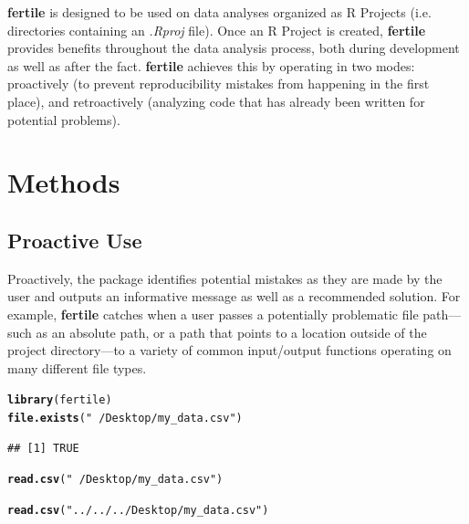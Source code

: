 \documentclass[APA,LATO1COL]{WileyNJD-v2}\usepackage[]{graphicx}\usepackage[]{color}
\makeatletter
\newcommand{\hlstr}[1]{\textcolor[rgb]{0.192,0.494,0.8}{#1}}%
\newcommand{\hlstd}[1]{\textcolor[rgb]{0.345,0.345,0.345}{#1}}%
\newcommand{\hlkwd}[1]{\textcolor[rgb]{0.737,0.353,0.396}{\textbf{#1}}}%
\newenvironment{kframe}{%
 \def\at@end@of@kframe{}%
 \ifinner\ifhmode%
  \def\at@end@of@kframe{\end{minipage}}%
  \begin{minipage}{\columnwidth}%
 \fi\fi%
 \def\FrameCommand##1{\hskip\@totalleftmargin \hskip-\fboxsep
 \colorbox{shadecolor}{##1}\hskip-\fboxsep
     \hskip-\linewidth \hskip-\@totalleftmargin \hskip\columnwidth}%
 \MakeFramed {\advance\hsize-\width
   \@totalleftmargin\z@ \linewidth\hsize
   \@setminipage}}%
 {\par\unskip\endMakeFramed%
 \at@end@of@kframe}
\newenvironment{knitrout}{}{} %
\newcommand{\R}{\textsf{R}\xspace}
\newcommand{\cmd}[1]{\textit{#1}}
\newcommand{\pkg}[1]{\textbf{#1}}
\makeatother
\begin{document}
\pkg{fertile} is designed to be used on data analyses organized as \R Projects (i.e. directories containing an \cmd{.Rproj} file). Once an \R Project is created, \pkg{fertile} provides benefits throughout the data analysis process, both during development as well as after the fact. \pkg{fertile} achieves this by operating in two modes: proactively (to prevent reproducibility mistakes from happening in the first place), and retroactively (analyzing code that has already been written for potential problems).


\section{Methods}\label{sec3}

\subsection{Proactive Use}

Proactively, the package identifies potential mistakes as they are made by the user and outputs an informative message as well as a recommended solution. For example, \pkg{fertile} catches when a user passes a potentially problematic file path---such as an absolute path, or a path that points to a location outside of the project directory---to a variety of common input/output functions operating on many different file types.



\begin{knitrout}
\color{fgcolor}\begin{kframe}
\begin{alltt}
\hlkwd{library}\hlstd{(fertile)}
\hlkwd{file.exists}\hlstd{(}\hlstr{"~/Desktop/my_data.csv"}\hlstd{)}
\end{alltt}
\begin{verbatim}
## [1] TRUE
\end{verbatim}
\begin{alltt}
\hlkwd{read.csv}\hlstd{(}\hlstr{"~/Desktop/my_data.csv"}\hlstd{)}
\end{alltt}


{\ttfamily\noindent\bfseries\color{errorcolor}{\#\# Error: Detected absolute paths}}\begin{alltt}
\hlkwd{read.csv}\hlstd{(}\hlstr{"../../../Desktop/my_data.csv"}\hlstd{)}
\end{alltt}


{\ttfamily\noindent\bfseries\color{errorcolor}{\#\# Error: Detected paths that lead outside the project directory}}\end{kframe}
\end{knitrout}
\end{document}
